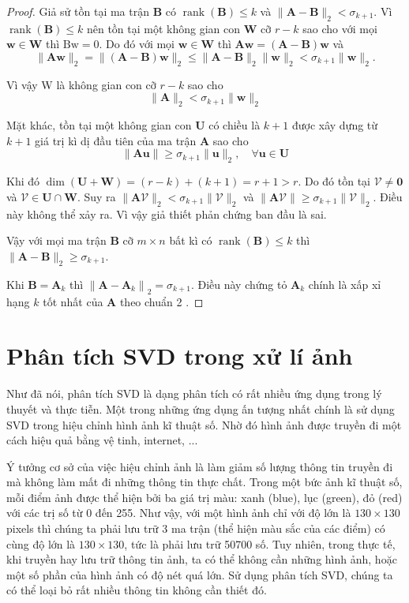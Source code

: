 \documentclass[14pt,oneside,a4paper]{report}
\numberwithin{equation}{section}
\begin{document}
\begin{proof}
Giả sử tồn tại ma trận $\mathbf{B}$ có $\operatorname{rank}(\mathbf{B}) \leqslant k$ và $\|\mathbf{A}-\mathbf{B}\|_{2}<\sigma_{k+1}$. Vì $\operatorname{rank}(\mathbf{B}) \leqslant k$ nên tồn tại một không gian con $\mathbf{W}$ cỡ $r-k$ sao cho với mọi $\mathbf{w} \in \mathbf{W}$ thì $\mathrm{Bw}=0$.
Do đó với mọi $\mathbf{w} \in \mathbf{W}$ thì $\mathbf{A} \mathbf{w}=(\mathbf{A}-\mathbf{B}) \mathbf{w}$ và
$$
\|\mathbf{A} \mathbf{w}\|_{2}=\|(\mathbf{A}-\mathbf{B}) \mathbf{w}\|_{2} \leqslant\|\mathbf{A}-\mathbf{B}\|_{2}\|\mathbf{w}\|_{2}<\sigma_{k+1}\|\mathbf{w}\|_{2} .
$$

Vì vậy W là không gian con cỡ $r-k$ sao cho
$$
\|\mathbf{A}\|_{2}<\sigma_{k+1}\|\mathbf{w}\|_{2}
$$

Mặt khác, tồn tại một không gian con $\mathbf{U}$ có chiều là $k+1$ được xây dựng từ $k+1$ giá trị kì dị đầu tiên của ma trận $\mathbf{A}$ sao cho
$$
\|\mathbf{A} \mathbf{u}\| \geqslant \sigma_{k+1}\|\mathbf{u}\|_{2}, \quad \forall \mathbf{u} \in \mathbf{U}
$$

Khi đó $\operatorname{dim}(\mathbf{U}+\mathbf{W})=(r-k)+(k+1)=r+1>r$. Do đó tồn tại $\mathcal{V} \neq \mathbf{0}$ và $\mathcal{V} \in \mathbf{U} \cap \mathbf{W}$. Suy ra $\|\mathbf{A} \mathcal{V}\|_{2}<\sigma_{k+1}\|\mathcal{V}\|_{2}$ và $\|\mathbf{A} \mathcal{V}\| \geqslant \sigma_{k+1}\|\mathcal{V}\|_{2}$. Điều này không thể xảy ra. Vì vậy giả thiết phản chứng ban đầu là sai.

Vậy với mọi ma trận $\mathbf{B}$ cỡ $m \times n$ bất kì có $\operatorname{rank}(\mathbf{B}) \leqslant k$ thì $\|\mathbf{A}-\mathbf{B}\|_{2} \geqslant \sigma_{k+1}$.

Khi $\mathbf{B}=\mathbf{A}_{k}$ thì $\left\|\mathbf{A}-\mathbf{A}_{k}\right\|_{2}=\sigma_{k+1}$. Điều này chứng tỏ $\mathbf{A}_{k}$ chính là xấp xỉ hạng $k$ tốt nhất của $\mathbf{A}$ theo chuẩn 2 . 
\end{proof}

\section{Phân tích SVD trong xử lí ảnh}

Như đã nói, phân tích SVD là dạng phân tích có rất nhiều ứng dụng trong lý thuyết và thực tiễn. Một trong những ứng dụng ấn tượng nhất chính là sử dụng SVD trong hiệu chỉnh hình ảnh kĩ thuật số. Nhờ đó hình ảnh được truyền đi một cách hiệu quả bằng vệ tinh, internet, ...

Ý tưởng cơ sở của việc hiệu chỉnh ảnh là làm giảm số lượng thông tin truyền đi mà không làm mất đi những thông tin thực chất. Trong một bức ảnh kĩ thuật số, mỗi điểm ảnh được thể hiện bởi ba giá trị màu: xanh (blue), lục (green), đỏ (red) với các trị số từ 0 đến 255. Như vậy, với một hình ảnh chỉ với độ lớn là $130 \times 130$ pixels thì chúng ta phải lưu trữ 3 ma trận (thể hiện màu sắc của các điểm) có cùng độ lớn là $130 \times 130$, tức là phải lưu trữ 50700 số. Tuy nhiên, trong thực tế, khi truyền hay lưu trữ thông tin ảnh, ta có thể không cần những hình ảnh, hoặc một số phần của hình ảnh có độ nét quá lớn. Sử dụng phân tích SVD, chúng ta có thể loại bỏ rất nhiều thông tin không cần thiết đó.
\end{document}
